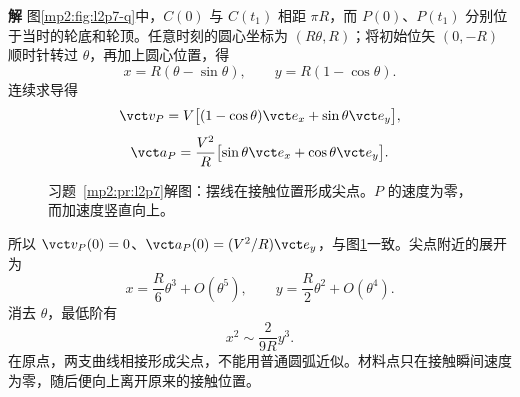 \documentclass[11pt,openany,fontset=fandol]{ctexbook}
\theoremstyle{definition}\newtheorem{example}{例}[chapter]\newtheorem{exercise}{习题}[chapter]
\newcommand{\SolutionStart}{\par\medskip\ifdim\pagetotal>0pt\ifdim\dimexpr\pagegoal-\pagetotal\relax<3\baselineskip\newpage\fi\fi\noindent\textbf{解}\quad\ignorespaces}
\newenvironment{solution}{\SolutionStart}{\par\medskip}
\begin{document}
\begin{solution}
图\ref{mp2:fig:l2p7-q}中，$C(0)$ 与 $C(t_1)$ 相距 $\pi R$，而 $P(0)$、$P(t_1)$ 分别位于当时的轮底和轮顶。任意时刻的圆心坐标为 $(R\theta,R)$；将初始位矢 $(0,-R)$ 顺时针转过 $\theta$，再加上圆心位置，得
\[
x=R(\theta-\sin\theta),\qquad y=R(1-\cos\theta).
\]
连续求导得
\[
\vct v_P=V\bigl[(1-\cos\theta)\vct e_x+\sin\theta\vct e_y\bigr],
\]
\[
\vct a_P=\frac{V^2}{R}
\bigl[\sin\theta\vct e_x+\cos\theta\vct e_y\bigr].
\]

\begin{figure}[H]\centering
{}
\caption{习题~\ref{mp2:pr:l2p7}解图：摆线在接触位置形成尖点。$P$ 的速度为零，而加速度竖直向上。}\label{mp2:fig:l2p7-s}
\end{figure}

所以 $\vct v_P(0)=0$、$\vct a_P(0)=(V^2/R)\vct e_y$，与图\ref{mp2:fig:l2p7-s}一致。尖点附近的展开为
\[
x=\frac R6\theta^3+O(\theta^5),\qquad
y=\frac R2\theta^2+O(\theta^4).
\]
消去 $\theta$，最低阶有
\[
x^2\sim\frac{2}{9R}y^3.
\]
在原点，两支曲线相接形成尖点，不能用普通圆弧近似。材料点只在接触瞬间速度为零，随后便向上离开原来的接触位置。

\end{solution}
\end{document}
